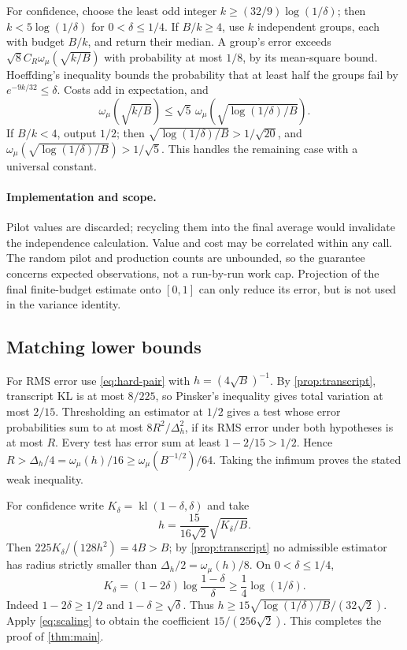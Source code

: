 \documentclass[11pt,a4paper]{article}
\theoremstyle{definition}
\newcommand{\kl}{\operatorname{kl}}
\newcommand{\om}{\omega_\mu}
\begin{document}
For confidence, choose the least odd integer
$k\ge(32/9)\log(1/\delta)$; then $k<5\log(1/\delta)$ for
$0<\delta\le1/4$. If $B/k\ge4$, use $k$ independent groups, each with
budget $B/k$, and return their median. A group's error exceeds
$\sqrt8 C_R\om(\sqrt{k/B})$ with probability at most $1/8$, by its
mean-square bound. Hoeffding's inequality bounds the probability that
at least half the groups fail by $e^{-9k/32}\le\delta$.
Costs add in expectation, and
\[
 \om(\sqrt{k/B})\le\sqrt5\,
 \om\!\left(\sqrt{\log(1/\delta)/B}\right).
\]
If $B/k<4$, output $1/2$; then
$\sqrt{\log(1/\delta)/B}>1/\sqrt{20}$, and
$\om(\sqrt{\log(1/\delta)/B})>1/\sqrt5$.
This handles the remaining case with a universal constant.

\paragraph{Implementation and scope.}
Pilot values are discarded; recycling them into the final average would
invalidate the independence calculation. Value and cost may be correlated
within any call. The random pilot and production counts are unbounded, so
the guarantee concerns expected observations, not a run-by-run work cap.
Projection of the final finite-budget estimate onto $[0,1]$ can only reduce
its error, but is not used in the variance identity.

\subsection{Matching lower bounds}
For RMS error use \eqref{eq:hard-pair} with $h=(4\sqrt B)^{-1}$.
By \cref{prop:transcript}, transcript KL is at most $8/225$, so Pinsker's
inequality gives total variation at most $2/15$.
Thresholding an estimator at $1/2$ gives a test whose error probabilities
sum to at most $8R^2/\Delta_h^2$, if its RMS error under both hypotheses
is at most $R$. Every test has error sum at least $1-2/15>1/2$.
Hence $R>\Delta_h/4=\om(h)/16\ge\om(B^{-1/2})/64$.
Taking the infimum proves the stated weak inequality.

For confidence write $K_\delta=\kl(1-\delta,\delta)$ and take
\[
 h=\frac{15}{16\sqrt2}\sqrt{K_\delta/B}.
\]
Then $225K_\delta/(128h^2)=4B>B$; by \cref{prop:transcript} no admissible
estimator has radius strictly smaller than $\Delta_h/2=\om(h)/8$.
On $0<\delta\le1/4$,
\begin{equation}\label{eq:confidence-kl}
 K_\delta=(1-2\delta)\log\frac{1-\delta}{\delta}
 \ge\frac14\log(1/\delta).
\end{equation}
Indeed $1-2\delta\ge1/2$ and $1-\delta\ge\sqrt\delta$.
Thus $h\ge15\sqrt{\log(1/\delta)/B}/(32\sqrt2)$.
Apply \eqref{eq:scaling} to obtain the coefficient $15/(256\sqrt2)$.
This completes the proof of \cref{thm:main}.
\end{document}
